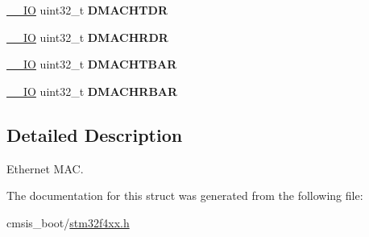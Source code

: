 \begin{DoxyCompactItemize}
\item 
\hyperlink{core__cm4_8h_aec43007d9998a0a0e01faede4133d6be}{\+\_\+\+\_\+\+IO} uint32\+\_\+t {\bfseries D\+M\+A\+C\+H\+T\+DR}\hypertarget{struct_e_t_h___type_def_ab02310e389320a383022b666af621ba9}{}\label{struct_e_t_h___type_def_ab02310e389320a383022b666af621ba9}

\item 
\hyperlink{core__cm4_8h_aec43007d9998a0a0e01faede4133d6be}{\+\_\+\+\_\+\+IO} uint32\+\_\+t {\bfseries D\+M\+A\+C\+H\+R\+DR}\hypertarget{struct_e_t_h___type_def_ab4a222f725cc43952993519b20466637}{}\label{struct_e_t_h___type_def_ab4a222f725cc43952993519b20466637}

\item 
\hyperlink{core__cm4_8h_aec43007d9998a0a0e01faede4133d6be}{\+\_\+\+\_\+\+IO} uint32\+\_\+t {\bfseries D\+M\+A\+C\+H\+T\+B\+AR}\hypertarget{struct_e_t_h___type_def_abb2eba5ee2a1621abeeb59e3aadc0318}{}\label{struct_e_t_h___type_def_abb2eba5ee2a1621abeeb59e3aadc0318}

\item 
\hyperlink{core__cm4_8h_aec43007d9998a0a0e01faede4133d6be}{\+\_\+\+\_\+\+IO} uint32\+\_\+t {\bfseries D\+M\+A\+C\+H\+R\+B\+AR}\hypertarget{struct_e_t_h___type_def_a03160db5ffae457bab55c0358c4ef998}{}\label{struct_e_t_h___type_def_a03160db5ffae457bab55c0358c4ef998}

\end{DoxyCompactItemize}


\subsection{Detailed Description}
Ethernet M\+AC. 

The documentation for this struct was generated from the following file\+:\begin{DoxyCompactItemize}
\item 
cmsis\+\_\+boot/\hyperlink{stm32f4xx_8h}{stm32f4xx.\+h}\end{DoxyCompactItemize}

